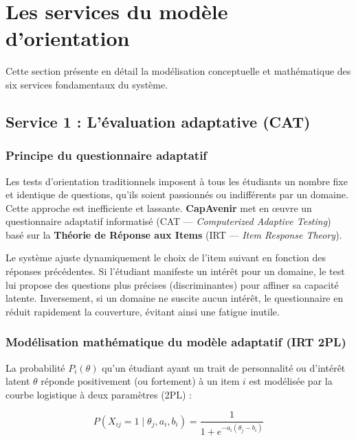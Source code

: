 \section{Les services du modèle d'orientation}
\label{sec:services}

Cette section présente en détail la modélisation conceptuelle et mathématique des six services fondamentaux du système.

\subsection{Service 1 : L'évaluation adaptative (CAT)}

\subsubsection{Principe du questionnaire adaptatif}

Les tests d'orientation traditionnels imposent à tous les étudiants un nombre fixe et identique de questions, qu'ils soient passionnés ou indifférents par un domaine. Cette approche est inefficiente et lassante. \textbf{CapAvenir} met en œuvre un questionnaire adaptatif informatisé (CAT — \textit{Computerized Adaptive Testing}) basé sur la \textbf{Théorie de Réponse aux Items} (IRT — \textit{Item Response Theory}).

Le système ajuste dynamiquement le choix de l'item suivant en fonction des réponses précédentes. Si l'étudiant manifeste un intérêt pour un domaine, le test lui propose des questions plus précises (discriminantes) pour affiner sa capacité latente. Inversement, si un domaine ne suscite aucun intérêt, le questionnaire en réduit rapidement la couverture, évitant ainsi une fatigue inutile.

\subsubsection{Modélisation mathématique du modèle adaptatif (IRT 2PL)}

La probabilité $P_i(\theta)$ qu'un étudiant ayant un trait de personnalité ou d'intérêt latent $\theta$ réponde positivement (ou fortement) à un item $i$ est modélisée par la courbe logistique à deux paramètres (2PL) :

\begin{equation}
P(X_{ij} = 1 \mid \theta_j, a_i, b_i) = \frac{1}{1 + e^{-a_i(\theta_j - b_i)}}
\label{eq:irt_2pl}
\end{equation}


